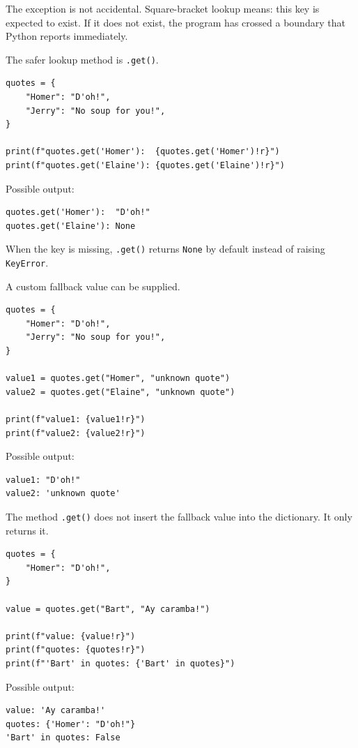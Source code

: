 The exception is not accidental. Square-bracket lookup means: this key is expected to exist. If it does not exist, the program has crossed a boundary that Python reports immediately.

The safer lookup method is \texttt{.get()}.

\begin{verbatim}
quotes = {
    "Homer": "D'oh!",
    "Jerry": "No soup for you!",
}

print(f"quotes.get('Homer'):  {quotes.get('Homer')!r}")
print(f"quotes.get('Elaine'): {quotes.get('Elaine')!r}")
\end{verbatim}

Possible output:

\begin{verbatim}
quotes.get('Homer'):  "D'oh!"
quotes.get('Elaine'): None
\end{verbatim}

When the key is missing, \texttt{.get()} returns \texttt{None} by default instead of raising \texttt{KeyError}.

A custom fallback value can be supplied.

\begin{verbatim}
quotes = {
    "Homer": "D'oh!",
    "Jerry": "No soup for you!",
}

value1 = quotes.get("Homer", "unknown quote")
value2 = quotes.get("Elaine", "unknown quote")

print(f"value1: {value1!r}")
print(f"value2: {value2!r}")
\end{verbatim}

Possible output:

\begin{verbatim}
value1: "D'oh!"
value2: 'unknown quote'
\end{verbatim}

The method \texttt{.get()} does not insert the fallback value into the dictionary. It only returns it.

\begin{verbatim}
quotes = {
    "Homer": "D'oh!",
}

value = quotes.get("Bart", "Ay caramba!")

print(f"value: {value!r}")
print(f"quotes: {quotes!r}")
print(f"'Bart' in quotes: {'Bart' in quotes}")
\end{verbatim}

Possible output:

\begin{verbatim}
value: 'Ay caramba!'
quotes: {'Homer': "D'oh!"}
'Bart' in quotes: False
\end{verbatim}

